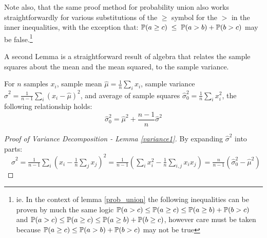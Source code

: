 Note also, that the same proof method for probability union also works straightforwardly for various substitutions of the $\ge$ symbol for the $>$ in the inner inequalities, with the exception that: $\operatorname{\mathbb{P}}(a\ge c) \; \le \; \operatorname{\mathbb{P}}(a>b) + \operatorname{\mathbb{P}}(b>c)$ may be false.\footnote{ie. In the context of lemma \ref{prob_union} the following inequalities can be proven by much the same logic $\operatorname{\mathbb{P}}(a>c)\le\operatorname{\mathbb{P}}(a\ge c)\le\operatorname{\mathbb{P}}(a\ge b)+\operatorname{\mathbb{P}}(b>c)$ and $\operatorname{\mathbb{P}}(a>c)\le\operatorname{\mathbb{P}}(a\ge c)\le\operatorname{\mathbb{P}}(a\ge b)+\operatorname{\mathbb{P}}(b\ge c)$, however care must be taken because $\operatorname{\mathbb{P}}(a\ge c)\le\operatorname{\mathbb{P}}(a>b)+\operatorname{\mathbb{P}}(b>c)$ may not be true}

A second Lemma is a straightforward result of algebra that relates the sample squares about the mean and the mean squared, to the sample variance.
\begin{lemma}\label{variance1}
For $n$ samples $x_i$, sample mean $\hat{\mu} = \frac{1}{n}\sum_ix_i$, sample variance $\hat{\sigma}^2=\frac{1}{n-1}\sum_i(x_i-\hat{\mu})^2$, and average of sample squares $\hat{\sigma}_0^2 = \frac{1}{n}\sum_ix_i^2$, the following relationship holds:
\[
\hat{\sigma}_0^2=\hat{\mu}^2+\frac{n-1}{n}\hat{\sigma}^2
\]
\end{lemma}
\begin{proof}[Proof of Variance Decomposition - Lemma \ref{variance1}]
By expanding $\hat{\sigma}^2$ into parts:\\
\(\quad\hat{\sigma}^2=\frac{1}{n-1}\sum_i\left(x_i-\frac{1}{n}\sum_jx_j \right)^2 
=\frac{1}{n-1}\left(\sum_ix_i^2-\frac{1}{n}\sum_{i,j}x_ix_j \right) = \frac{n}{n-1}\left(\hat{\sigma}_0^2-\hat{\mu}^2\right)\)
\end{proof}







